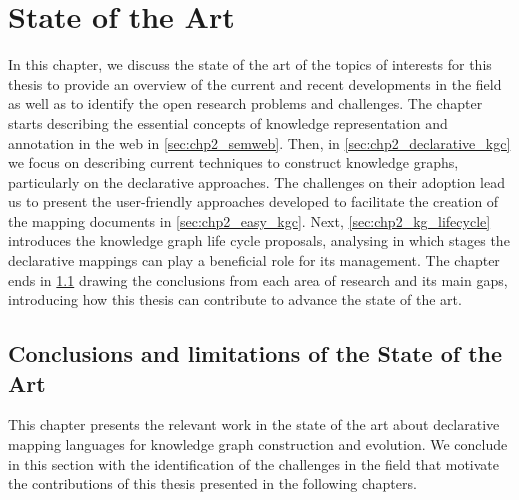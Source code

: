 \chapter{State of the Art}
\label{chapter:sota}

In this chapter, we discuss the state of the art of the topics of interests for this thesis to provide an overview of the current and recent developments in the field as well as to identify the open research problems and challenges. The chapter starts describing the essential concepts of knowledge representation and annotation in the web in \cref{sec:chp2_semweb}. Then, in \cref{sec:chp2_declarative_kgc} we focus on describing current techniques to construct knowledge graphs, particularly on the declarative approaches. The challenges on their adoption lead us to present the user-friendly approaches developed to facilitate the creation of the mapping documents in \cref{sec:chp2_easy_kgc}. Next, \cref{sec:chp2_kg_lifecycle} introduces the knowledge graph life cycle proposals, analysing in which stages the declarative mappings can play a beneficial role for its management. The chapter ends in \cref{sec:chp2_conclusions-sota} drawing the conclusions from each area of research and its main gaps, introducing how this thesis can contribute to advance the state of the art. 










\section{Conclusions and limitations of the State of the Art}
\label{sec:chp2_conclusions-sota}

This chapter presents the relevant work in the state of the art about declarative mapping languages for knowledge graph construction and evolution. We conclude in this section with the identification of the challenges in the field that motivate the contributions of this thesis presented in the following chapters.


